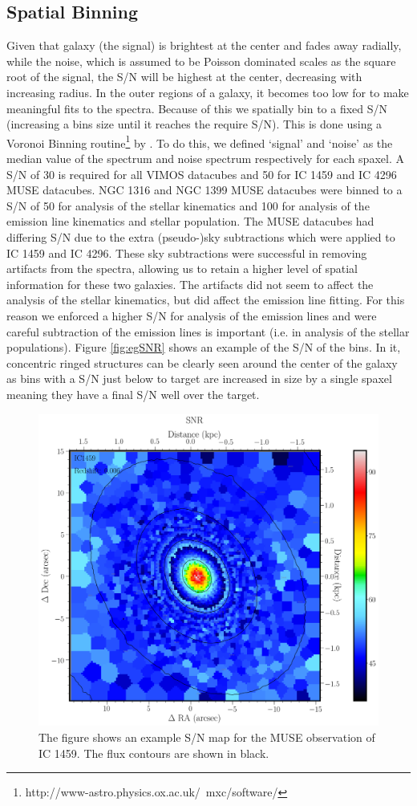 	\subsection{Spatial Binning}
		\label{subsec:Binning}
		Given that galaxy (the signal) is brightest at the center and fades away radially, while the noise, which is assumed to be Poisson dominated scales as the square root of the signal, the S/N will be highest at the center, decreasing with increasing radius. In the outer regions of a galaxy, it becomes too low for to make meaningful fits to the spectra. Because of this we spatially bin to a fixed S/N (increasing a bins size until it reaches the require S/N). This is done using a Voronoi Binning routine\footnote{http://www-astro.physics.ox.ac.uk/~mxc/software/} by \citet{Cappellari2003}. To do this, we defined `signal' and `noise' as the median value of the spectrum and noise spectrum respectively for each spaxel. A S/N of 30 is required for all VIMOS datacubes and 50 for IC 1459 and IC 4296 MUSE datacubes. NGC 1316 and NGC 1399 MUSE datacubes were binned to a S/N of 50 for analysis of the stellar kinematics and 100 for analysis of the emission line kinematics and stellar population. The MUSE datacubes had differing S/N due to the extra (pseudo-)sky subtractions which were applied to IC 1459 and IC 4296. These sky subtractions were successful in removing artifacts from the spectra, allowing us to retain a higher level of spatial information for these two galaxies. The artifacts did not seem to affect the analysis of the stellar kinematics, but did affect the emission line fitting. For this reason we enforced a higher S/N for analysis of the emission lines and were careful subtraction of the emission lines is important (i.e. in analysis of the stellar populations). Figure \ref{fig:egSNR} shows an example of the S/N of the bins. In it, concentric ringed structures can be clearly seen around the center of the galaxy as bins with a S/N just below to target are increased in size by a single spaxel meaning they have a final S/N well over the target.

		\begin{figure}
			\centering
			\includegraphics[width=.6\textwidth]{chapter2/egSNR.png}
			\caption[Example S/N map]{The figure shows an example S/N map for the MUSE observation of IC 1459. The flux contours are shown in black.}
			\label{fig:MassRe}
		\end{figure}

